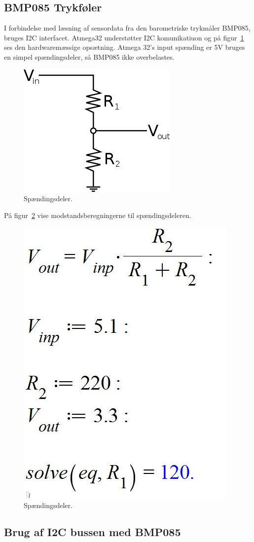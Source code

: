 \subsection{BMP085 Trykføler}

I forbindelse med læsning af sensordata fra den barometriske trykmåler BMP085, bruges I2C interfacet. Atmega32 understøtter I2C komunikatiuon og på figur~\ref{fig:voltagedivider} ses den hardwaremæssige opsætning. Atmega 32’s input spænding er 5V bruges en simpel spændingsdeler, så BMP085 ikke overbelastes.


\begin{figure}[h]
	\centering
	\includegraphics[width=0.4\linewidth]{figs/voltage_divider}
	\caption{Spændingsdeler.}
	\label{fig:voltagedivider}
\end{figure}

På figur~\ref{fig:voltagediv} vise modstandsberegningerne til spændingsdeleren.

\begin{figure}[h]
	\centering
	\includegraphics[width=0.4\linewidth]{figs/voltage_div}
	\caption{Spændingsdeler.}
	\label{fig:voltagediv}
\end{figure}

\subsection{Brug af I2C bussen med BMP085}

